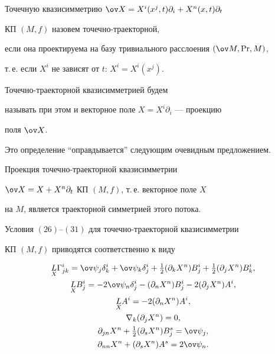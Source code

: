 


\begin{defn} 


Точечную квазисимметрию $\ov X=X^i(x^j,t)\partial_i+X^n(x,t)\partial_t$ 


КП $(M,f)$ назовем точечно-траекторной, 


если она проектируема на базу тривиального расслоения $(\ov M,\Pr,M)$, 


т.\,е. если $X^i$ не зависят от $t$: $X^i=X^i(x^j)$. 


Точечно-траекторной квазисимметрией будем 


называть при этом и векторное поле $X=X^i\partial_i$ --- проекцию 


поля $\ov X$. 


\end{defn} 


 


Это определение ``оправдывается'' следующим очевидным предложением. 


 


\begin{prop} 


Проекция точечно-траекторной квазисимметрии 


$\ov X=X+X^n\partial_t$ КП $(M,f)$, т.\,е. векторное поле $X$ 


на $M$, является траекторной симметрией этого потока. 


 


Условия $(26)$--$(31)$ для точечно-траекторной квазисимметрии 


КП $(M,f)$ приводятся соответственно к виду 


\begin{gather} 


\down{X}{L}\Gamma^i_{j k}=\ov \psi_j\delta^i_k+ 


\ov\psi_k\delta^i_j+\tfrac{1}{2}(\partial_k X^n)B^i_j+ 


\tfrac{1}{2}(\partial_j X^n)B^i_k, \\ 


% 


\down{X}{L}B^i_j=-2\ov\psi_n\delta^i_j- 


(\partial_n X^n)B^i_j-2(\partial_j X^n)A^i,\\ 


% 


\down{X}{L}A^i=-2(\partial_n X^n)A^i,\\ 


% 


\nabla_k(\partial_j X^n)=0,\\


%


\partial_{j n}X^n+\tfrac{1}{2}(\partial_s X^n)B^s_j=\ov\psi_j,\\ 


% 


\partial_{n n}X^n+(\partial_s X^n)A^s=2\ov\psi_n. 


\end{gather} 


\end{prop} 


